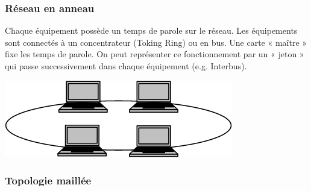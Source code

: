 \documentclass[10pt]{article}
\begin{document}
\subsubsection*{Réseau en anneau}
\begin{minipage}[c]{.66\linewidth}
Chaque équipement possède un temps de parole sur le réseau. Les équipements sont connectés à un concentrateur (Toking Ring) ou en bus. Une carte « maître » fixe les temps de parole. On peut représenter ce fonctionnement par un « jeton » qui passe successivement dans chaque équipement (e.g. Interbus).
\end{minipage} \hfill
\begin{minipage}[c]{.3\linewidth}
\begin{center}
\includegraphics[width=.95\textwidth]{images/fig_03}
\end{center}
\end{minipage} 

\subsubsection*{Topologie maillée}
\end{document}

